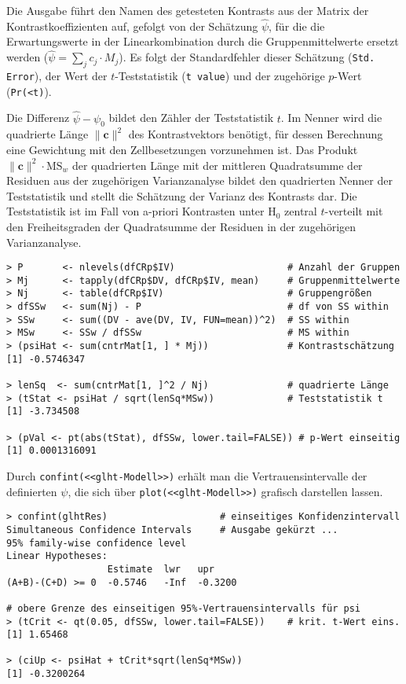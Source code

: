 Die Ausgabe führt den Namen des getesteten Kontrasts aus der Matrix der Kontrastkoeffizienten auf, gefolgt von der Schätzung $\hat{\psi}$, für die die Erwartungswerte in der Linearkombination durch die Gruppenmittelwerte ersetzt werden ($\hat{\psi} = \sum_{j} c_{j} \cdot M_{j}$). Es folgt der Standardfehler dieser Schätzung (\lstinline!Std. Error!), der Wert der $t$-Teststatistik (\lstinline!t value!) und der zugehörige $p$-Wert (\lstinline!Pr(<t)!).

Die Differenz $\hat{\psi} - \psi_{0}$ bildet den Zähler der Teststatistik $t$. Im Nenner wird die quadrierte Länge $\|\bm{c}\|^{2}$ des Kontrastvektors benötigt, für dessen Berechnung eine Gewichtung mit den Zellbesetzungen vorzunehmen ist. Das Produkt $\|\bm{c}\|^{2} \cdot \text{MS}_{w}$ der quadrierten Länge mit der mittleren Quadratsumme der Residuen aus der zugehörigen Varianzanalyse bildet den quadrierten Nenner der Teststatistik und stellt die Schätzung der Varianz des Kontrasts dar. Die Teststatistik ist im Fall von a-priori Kontrasten unter $\text{H}_{0}$ zentral $t$-verteilt mit den Freiheitsgraden der Quadratsumme der Residuen in der zugehörigen Varianzanalyse.
\begin{lstlisting}
> P       <- nlevels(dfCRp$IV)                    # Anzahl der Gruppen
> Mj      <- tapply(dfCRp$DV, dfCRp$IV, mean)     # Gruppenmittelwerte
> Nj      <- table(dfCRp$IV)                      # Gruppengrößen
> dfSSw   <- sum(Nj) - P                          # df von SS within
> SSw     <- sum((DV - ave(DV, IV, FUN=mean))^2)  # SS within
> MSw     <- SSw / dfSSw                          # MS within
> (psiHat <- sum(cntrMat[1, ] * Mj))              # Kontrastschätzung
[1] -0.5746347

> lenSq  <- sum(cntrMat[1, ]^2 / Nj)              # quadrierte Länge
> (tStat <- psiHat / sqrt(lenSq*MSw))             # Teststatistik t
[1] -3.734508

> (pVal <- pt(abs(tStat), dfSSw, lower.tail=FALSE)) # p-Wert einseitig
[1] 0.0001316091
\end{lstlisting}

Durch \lstinline!confint(<<glht-Modell>>)! erhält man die Vertrauensintervalle der definierten $\psi$, die sich über \lstinline!plot(<<glht-Modell>>)! grafisch darstellen lassen.
\begin{lstlisting}
> confint(glhtRes)                    # einseitiges Konfidenzintervall
Simultaneous Confidence Intervals     # Ausgabe gekürzt ...
95% family-wise confidence level
Linear Hypotheses:
                  Estimate  lwr   upr    
(A+B)-(C+D) >= 0  -0.5746   -Inf  -0.3200

# obere Grenze des einseitigen 95%-Vertrauensintervalls für psi
> (tCrit <- qt(0.05, dfSSw, lower.tail=FALSE))    # krit. t-Wert eins.
[1] 1.65468

> (ciUp <- psiHat + tCrit*sqrt(lenSq*MSw))
[1] -0.3200264
\end{lstlisting}

